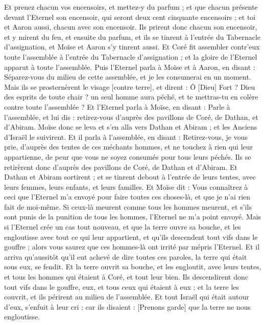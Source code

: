 \begin{multicols}{2}
Et prenez chacun vos encensoirs, et mettez-y du parfum ; et que chacun présente devant l'Eternel son encensoir, qui seront deux cent cinquante encensoirs ; et toi et Aaron aussi, chacun avec son encensoir.
Ils prirent donc chacun son encensoir, et y mirent du feu, et ensuite du parfum, et ils se tinrent à l'entrée du Tabernacle d'assignation, et Moïse et Aaron s'y tinrent aussi.
Et Coré fit assembler contr'eux toute l'assemblée à l'entrée du Tabernacle d'assignation ; et la gloire de l'Eternel apparut à toute l'assemblée.
Puis l'Eternel parla à Moïse et à Aaron, en disant :
Séparez-vous du milieu de cette assemblée, et je les consumerai en un moment.
Mais ils se prosternèrent le visage [contre terre], et dirent : Ô [Dieu] Fort ? Dieu des esprits de toute chair ? un seul homme aura péché, et te mettras-tu en colère contre toute l'assemblée ?
Et l'Eternel parla à Moïse, en disant :
Parle à l'assemblée, et lui dis : retirez-vous d'auprès des pavillons de Coré, de Dathan, et d'Abiram.
Moïse donc se leva et s'en alla vers Dathan et Abiram ; et les Anciens d'Israël le suivirent.
Et il parla à l'assemblée, en disant : Retirez-vous, je vous prie, d'auprès des tentes de ces méchants hommes, et ne touchez à rien qui leur appartienne, de peur que vous ne soyez consumés pour tous leurs péchés.
Ils se retirèrent donc d'auprès des pavillons de Coré, de Dathan et d'Abiram. Et Dathan et Abiram sortirent ; et se tinrent debout à l'entrée de leurs tentes, avec leurs femmes, leurs enfants, et leurs familles.
Et Moïse dit : Vous connaîtrez à ceci que l'Eternel m'a envoyé pour faire toutes ces choses-là, et que je n'ai rien fait de moi-même.
Si ceux-là meurent comme tous les hommes meurent, et s'ils sont punis de la punition de tous les hommes, l'Eternel ne m'a point envoyé.
Mais si l'Eternel crée un cas tout nouveau, et que la terre ouvre sa bouche, et les engloutisse avec tout ce qui leur appartient, et qu'ils descendent tout vifs dans le gouffre ; alors vous saurez que ces hommes-là ont irrité par mépris l'Eternel.
Et il arriva qu'aussitôt qu'il eut achevé de dire toutes ces paroles, la terre qui était sous eux, se fendit.
Et la terre ouvrit sa bouche, et les engloutit, avec leurs tentes, et tous les hommes qui étaient à Coré, et tout leur bien.
Ils descendirent donc tout vifs dans le gouffre, eux, et tous ceux qui étaient à eux ; et la terre les couvrit, et ils périrent au milieu de l'assemblée.
Et tout Israël qui était autour d'eux, s'enfuit à leur cri ; car ils disaient : [Prenons garde] que la terre ne nous engloutisse.

\end{multicols}
